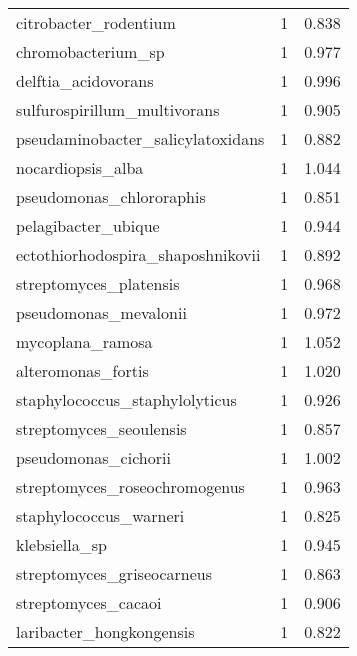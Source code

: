 \begin{tabular}{lrr}
                       citrobacter\_rodentium &                   1 &     0.838 \\
                          chromobacterium\_sp &                   1 &     0.977 \\
                         delftia\_acidovorans &                   1 &     0.996 \\
                sulfurospirillum\_multivorans &                   1 &     0.905 \\
           pseudaminobacter\_salicylatoxidans &                   1 &     0.882 \\
                           nocardiopsis\_alba &                   1 &     1.044 \\
                    pseudomonas\_chlororaphis &                   1 &     0.851 \\
                         pelagibacter\_ubique &                   1 &     0.944 \\
           ectothiorhodospira\_shaposhnikovii &                   1 &     0.892 \\
                      streptomyces\_platensis &                   1 &     0.968 \\
                       pseudomonas\_mevalonii &                   1 &     0.972 \\
                            mycoplana\_ramosa &                   1 &     1.052 \\
                          alteromonas\_fortis &                   1 &     1.020 \\
              staphylococcus\_staphylolyticus &                   1 &     0.926 \\
                     streptomyces\_seoulensis &                   1 &     0.857 \\
                        pseudomonas\_cichorii &                   1 &     1.002 \\
               streptomyces\_roseochromogenus &                   1 &     0.963 \\
                      staphylococcus\_warneri &                   1 &     0.825 \\
                               klebsiella\_sp &                   1 &     0.945 \\
                  streptomyces\_griseocarneus &                   1 &     0.863 \\
                         streptomyces\_cacaoi &                   1 &     0.906 \\
                    laribacter\_hongkongensis &                   1 &     0.822 \\

\end{tabular}
